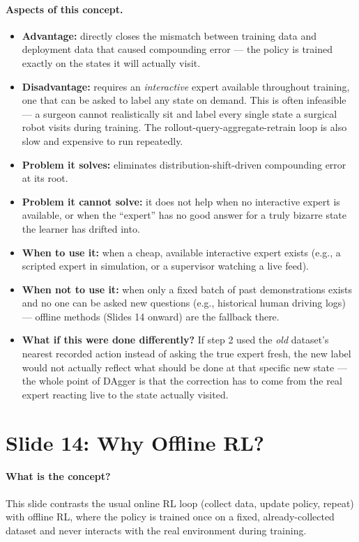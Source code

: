 \documentclass[11pt]{article}
\begin{document}
\paragraph{Aspects of this concept.}
\begin{itemize}
\item \textbf{Advantage:} directly closes the mismatch between training data and
deployment data that caused compounding error --- the policy is trained exactly on the
states it will actually visit.
\item \textbf{Disadvantage:} requires an \emph{interactive} expert available throughout
training, one that can be asked to label any state on demand. This is often infeasible
--- a surgeon cannot realistically sit and label every single state a surgical robot
visits during training. The rollout-query-aggregate-retrain loop is also slow and
expensive to run repeatedly.
\item \textbf{Problem it solves:} eliminates distribution-shift-driven compounding
error at its root.
\item \textbf{Problem it cannot solve:} it does not help when no interactive expert is
available, or when the ``expert'' has no good answer for a truly bizarre state the
learner has drifted into.
\item \textbf{When to use it:} when a cheap, available interactive expert exists (e.g.,
a scripted expert in simulation, or a supervisor watching a live feed).
\item \textbf{When not to use it:} when only a fixed batch of past demonstrations exists
and no one can be asked new questions (e.g., historical human driving logs) --- offline
methods (Slides 14 onward) are the fallback there.
\item \textbf{What if this were done differently?} If step 2 used the \emph{old}
dataset's nearest recorded action instead of asking the true expert fresh, the new label
would not actually reflect what should be done at that specific new state --- the whole
point of DAgger is that the correction has to come from the real expert reacting live to
the state actually visited.
\end{itemize}

\section{Slide 14: Why Offline RL?}

\paragraph{What is the concept?}
This slide contrasts the usual online RL loop (collect data, update policy, repeat)
with offline RL, where the policy is trained once on a fixed, already-collected dataset
and never interacts with the real environment during training.
\end{document}
